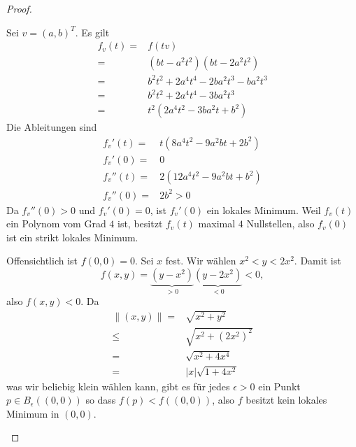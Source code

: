 \begin{proof}
\begin{parts}
\item Sei $v=(a,b)^T$. Es gilt 
	\begin{align*}
		f_v(t)=& f(tv)\\
		=&(bt-a^2t^2)(bt-2a^2t^2)\\
		=&b^2t^2+2a^4t^4-2ba^2t^3-ba^2t^3\\
		=&b^2t^2+2a^4t^4-3ba^2t^3\\
		=&t^2(2a^4t^2-3ba^2t+b^2)
	\end{align*}
	Die Ableitungen sind
	\begin{align*}
		f_v'(t)=& t(8a^4t^2-9a^2 bt+2b^2)\\
		f_v'(0)=&0\\
		f_v''(t)=& 2(12a^4 t^2-9a^2bt+b^2)\\
		f_v''(0)=&2b^2>0
	\end{align*}
	Da $f_v''(0)>0$ und $f_v'(0)=0$, ist $f_v'(0)$ ein lokales Minimum. Weil $f_v(t)$ ein Polynom vom Grad $4$ ist, besitzt $f_v(t)$ maximal $4$ Nullstellen, also $f_v(0)$ ist ein strikt lokales Minimum.
\item Offensichtlich ist $f(0,0)=0$. Sei $ x$ fest. Wir wählen $x^2<y<2x^2$. Damit ist
	\[
		f(x,y)=\underbrace{(y-x^2)}_{>0}\underbrace{(y-2x^2)}_{<0}<0
	,\]
	also $f(x,y)<0$. Da
	\begin{align*}
		\|(x,y)\|=& \sqrt{x^2+y^2} \\
		\le& \sqrt{x^2+(2x^2)^2} \\
		=& \sqrt{x^2+4x^4} \\
		=& |x|\sqrt{1+4x^2} 
	\end{align*}
	was wir beliebig klein wählen kann, gibt es f\"{u}r jedes $\epsilon>0$ ein Punkt $p\in B_\epsilon((0,0))$ so dass $f(p)<f((0,0))$, also $f$ besitzt kein lokales Minimum in $(0,0)$.\qedhere
\end{parts}
\end{proof}
